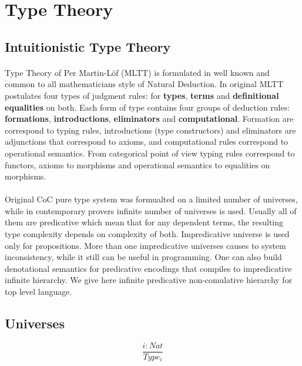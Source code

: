 \documentclass[11pt,oneside]{article}
\begin{document}
\newpage
\section{Type Theory}

\subsection{Intuitionistic Type Theory}

\paragraph{}
Type Theory of Per Martin-Löf (MLTT) is formulated in well known and common to all mathematicians style of Natural Deduction.
In original MLTT postulates four types of judgment rules: for {\bf types}, {\bf terms} and {\bf definitional equalities} on both.
Each form of type contains four groups of deduction rules:  {\bf formations}, {\bf introductions}, {\bf eliminators} and {\bf computational}.
Formation are correspond to typing rules, introductions (type constructors) and eliminators are adjunctions that correspond to axioms,
and computational rules correspond to operational semantics.
From categorical point of view typing rules correspond to functors, axioms to morphisms and operational semantics to equalities on morphisms.

\paragraph{}
Original CoC pure type system was formualted on a limited number of universes, while in contemporary provers infinite
number of universes is used. Usually all of them are predicative which mean that for any dependent terms,
the resulting type complexity depends on complexity of both. Impredicative universe is used only for propositions.
More than one impredicative universes causes to system inconsistency, while it still can be useful in programming.
One can also build denotational semantics for predicative encodings that compiles to impredicative infinite hierarchy.
We give here infinite predicative non-comulative hierarchy for top level language.

\subsection{Universes}

\begin{equation}
\tag{sorts}
\dfrac
  {i : Nat}
  {Type_i}
\end{equation}
\end{document}

